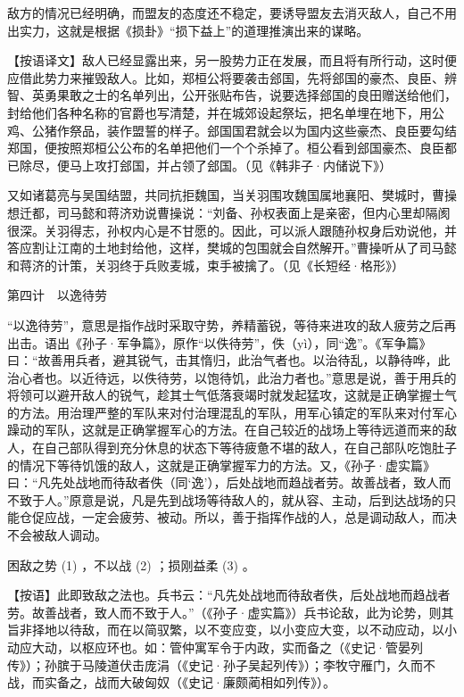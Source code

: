 \documentclass[12pt,UTF8]{ctexbook}
\begin{document}
敌方的情况已经明确，而盟友的态度还不稳定，要诱导盟友去消灭敌人，自己不用出实力，这就是根据《损卦》“损下益上”的道理推演出来的谋略。

【按语译文】敌人已经显露出来，另一股势力正在发展，而且将有所行动，这时便应借此势力来摧毁敌人。比如，郑桓公将要袭击郐国，先将郐国的豪杰、良臣、辨智、英勇果敢之士的名单列出，公开张贴布告，说要选择郐国的良田赠送给他们，封给他们各种名称的官爵也写清楚，并在城郊设起祭坛，把名单埋在地下，用公鸡、公猪作祭品，装作盟誓的样子。郐国国君就会以为国内这些豪杰、良臣要勾结郑国，便按照郑桓公公布的名单把他们一个个杀掉了。桓公看到郐国豪杰、良臣都已除尽，便马上攻打郐国，并占领了郐国。（见《韩非子·内储说下》）

又如诸葛亮与吴国结盟，共同抗拒魏国，当关羽围攻魏国属地襄阳、樊城时，曹操想迁都，司马懿和蒋济劝说曹操说：“刘备、孙权表面上是亲密，但内心里却隔阂很深。关羽得志，孙权内心是不甘愿的。因此，可以派人跟随孙权身后劝说他，并答应割让江南的土地封给他，这样，樊城的包围就会自然解开。”曹操听从了司马懿和蒋济的计策，关羽终于兵败麦城，束手被擒了。（见《长短经·格形》）





第四计　以逸待劳


“以逸待劳”，意思是指作战时采取守势，养精蓄锐，等待来进攻的敌人疲劳之后再出击。语出《孙子·军争篇》，原作“以佚待劳”，佚（yì），同“逸”。《军争篇》曰：“故善用兵者，避其锐气，击其惰归，此治气者也。以治待乱，以静待哗，此治心者也。以近待远，以佚待劳，以饱待饥，此治力者也。”意思是说，善于用兵的将领可以避开敌人的锐气，趁其士气低落衰竭时就发起猛攻，这就是正确掌握士气的方法。用治理严整的军队来对付治理混乱的军队，用军心镇定的军队来对付军心躁动的军队，这就是正确掌握军心的方法。在自己较近的战场上等待远道而来的敌人，在自己部队得到充分休息的状态下等待疲惫不堪的敌人，在自己部队吃饱肚子的情况下等待饥饿的敌人，这就是正确掌握军力的方法。又，《孙子·虚实篇》曰：“凡先处战地而待敌者佚（同‘逸’），后处战地而趋战者劳。故善战者，致人而不致于人。”原意是说，凡是先到战场等待敌人的，就从容、主动，后到达战场的只能仓促应战，一定会疲劳、被动。所以，善于指挥作战的人，总是调动敌人，而决不会被敌人调动。





困敌之势 (1) ，不以战 (2) ；损刚益柔 (3) 。

【按语】此即致敌之法也。兵书云：“凡先处战地而待敌者佚，后处战地而趋战者劳。故善战者，致人而不致于人。”（《孙子·虚实篇》）兵书论敌，此为论势，则其旨非择地以待敌，而在以简驭繁，以不变应变，以小变应大变，以不动应动，以小动应大动，以枢应环也。如：管仲寓军令于内政，实而备之（《史记·管晏列传》）；孙膑于马陵道伏击庞涓（《史记·孙子吴起列传》）；李牧守雁门，久而不战，而实备之，战而大破匈奴（《史记·廉颇蔺相如列传》）。
\end{document}
